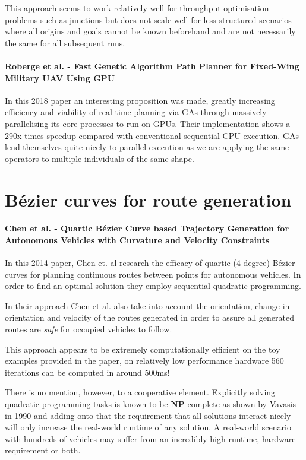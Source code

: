 This approach seems to work relatively well for throughput optimisation problems such as junctions but does not scale well for less structured scenarios where all origins and goals cannot be known beforehand and are not necessarily the same for all subsequent runs.

\paragraph{Roberge et al. - Fast Genetic Algorithm Path Planner for Fixed-Wing Military UAV Using GPU\cite{robergeFastGeneticAlgorithm2018}}

In this 2018 paper an interesting proposition was made, greatly increasing efficiency and viability of real-time planning via GAs through massively parallelising its core processes to run on GPUs. Their implementation shows a 290x times speedup compared with conventional sequential CPU execution. GAs lend themselves quite nicely to parallel execution as we are applying the same operators to multiple individuals of the same shape.

\section{Bézier curves for route generation}

\paragraph{Chen et al. - Quartic Bézier Curve based Trajectory Generation for Autonomous Vehicles with Curvature and Velocity Constraints}

In this 2014 paper, Chen et. al research the efficacy of quartic (4-degree) Bézier curves for planning continuous routes between points for autonomous vehicles. In order to find an optimal solution they employ sequential quadratic programming.

In their approach Chen et al. also take into account the orientation, change in orientation and velocity of the routes generated in order to assure all generated routes are \textit{safe} for occupied vehicles to follow.

This approach appears to be extremely computationally efficient on the toy examples provided in the paper, on relatively low performance hardware 560 iterations can be computed in around 500ms!

There is no mention, however, to a cooperative element. Explicitly solving quadratic programming tasks is known to be $\mathbf{NP}$-complete as shown by Vavasis in 1990\cite{VAVASIS199073} and adding onto that the requirement that all solutions interact nicely will only increase the real-world runtime of any solution. A real-world scenario with hundreds of vehicles may suffer from an incredibly high runtime, hardware requirement or both.

